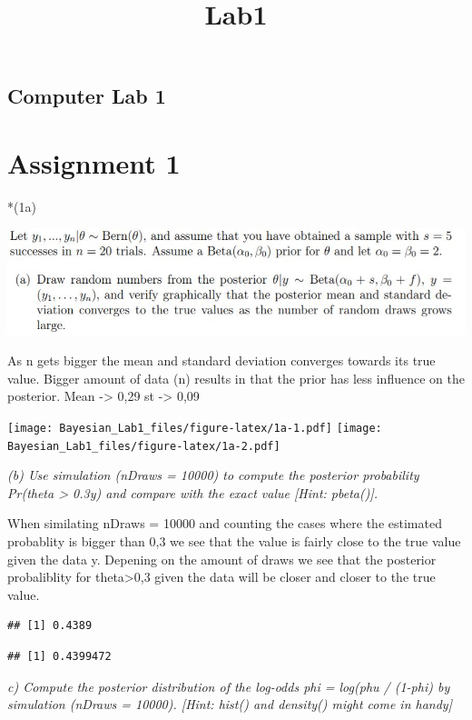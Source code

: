 \documentclass[]{article}
\title{Lab1}
\author{}
\date{}
\begin{document}
\maketitle

\hypertarget{computer-lab-1}{%
\subsection{Computer Lab 1}\label{computer-lab-1}}

\hypertarget{assignment-1}{%
\section{Assignment 1}\label{assignment-1}}

*(1a)

\includegraphics[width=0.6\linewidth]{1a}

As n gets bigger the mean and standard deviation converges towards its
true value. Bigger amount of data (n) results in that the prior has less
influence on the posterior. Mean -\textgreater{} 0,29 st -\textgreater{}
0,09

\texttt{[image: Bayesian\_Lab1\_files/figure-latex/1a-1.pdf]}
\texttt{[image: Bayesian\_Lab1\_files/figure-latex/1a-2.pdf]}

\emph{(b) Use simulation (nDraws = 10000) to compute the posterior
probability} \emph{Pr(theta \textgreater{} 0.3\textbar y) and compare
with the exact value {[}Hint: pbeta(){]}.}

When similating nDraws = 10000 and counting the cases where the
estimated probablity is bigger than 0,3 we see that the value is fairly
close to the true value given the data y. Depening on the amount of
draws we see that the posterior probaliblity for theta\textgreater0,3
given the data will be closer and closer to the true value.

\begin{verbatim}
## [1] 0.4389
\end{verbatim}

\begin{verbatim}
## [1] 0.4399472
\end{verbatim}

\emph{c) Compute the posterior distribution of the log-odds phi =
log(phu / (1-phi) by simulation (nDraws = 10000). {[}Hint: hist() and
density() might come in handy{]}}
\end{document}
